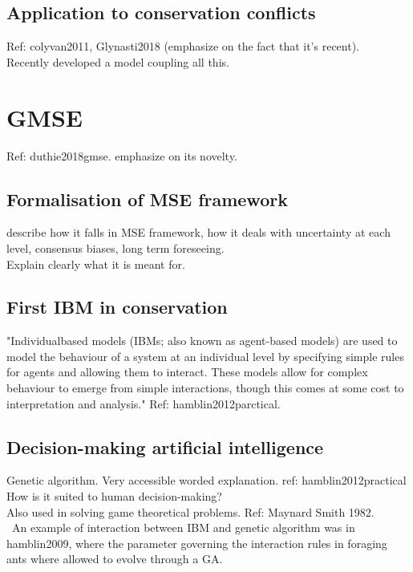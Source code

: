 \documentclass[12pt,a4paper]{article}
\begin{document}
\subsection{Application to conservation conflicts}
Ref: colyvan2011, Glynasti2018 (emphasize on the fact that it's recent).\\

Recently developed a model coupling all this.
\section{GMSE} Ref: duthie2018gmse. emphasize on its novelty.

\subsection{Formalisation of MSE framework}

describe how it falls in MSE framework, how it deals with uncertainty at each level, consensus biases, long term foreseeing.\\
Explain clearly what it is meant for.

\subsection{First IBM in conservation}

"Individualbased
models (IBMs; also known as agent-based models) are
used to model the behaviour of a system at an individual level
by specifying simple rules for agents and allowing them to
interact. These models allow for complex behaviour to emerge
from simple interactions, though this comes at some cost to
interpretation and analysis." Ref: hamblin2012parctical.

\subsection{Decision-making artificial intelligence}

Genetic algorithm. Very accessible worded explanation. ref: hamblin2012practical\\
How is it suited to human decision-making?\\
Also used in solving game theoretical problems. Ref: Maynard Smith 1982.\\\
An example of interaction between IBM and genetic algorithm was in hamblin2009, where the parameter governing the interaction rules in foraging ants where allowed to evolve through a GA. 
\end{document}
